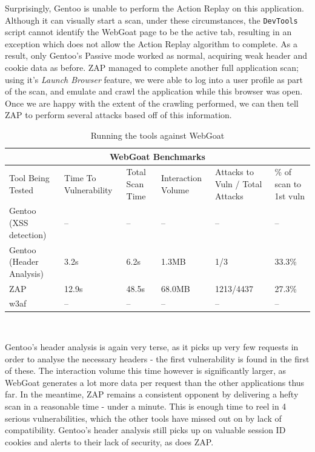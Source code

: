  Surprisingly, Gentoo is unable to perform the Action Replay on this application. Although it can visually start a scan, under these circumstances, the \texttt{DevTools} script cannot identify the WebGoat page to be the active tab, resulting in an exception which does not allow the Action Replay algorithm to complete. As a result, only Gentoo's Passive mode worked as normal, acquiring weak header and cookie data as before. ZAP managed to complete another full application scan; using it's \textit{Launch Browser} feature, we were able to log into a user profile as part of the scan, and emulate and crawl the application while this browser was open. Once we are happy with the extent of the crawling performed, we can then tell ZAP to perform several attacks based off of this information. \\

\begin{table}[h]
	
	{
		\captionsetup{justification=centering}		
		\caption{Running the tools against WebGoat}
		\label{table:webgoat_benchmarks}
		\begin{tabular}{ |p{4cm}||p{1.4cm}|p{1.4cm}|p{1.6cm}|p{2cm}|p{2cm}| }
			\hline
			\multicolumn{6}{|c|}{\textbf{WebGoat Benchmarks}} \\ [0.5ex]
			\hline \hline 
			Tool Being Tested& Time To Vulnerability & Total Scan Time & Interaction Volume & Attacks to Vuln / Total Attacks & \% of scan to 1st vuln \\
			\hline
			Gentoo (XSS detection)    & --     & --    &   --          & -- & -- \\
			Gentoo (Header Analysis) &  3.2s   & 6.2s   & 1.3MB   & 1/3 & 33.3\%\\
			ZAP                                   & 12.9s &  48.5s   & 68.0MB  & 1213/4437 & 27.3\%\\ 
			w3af                                 & -- & -- & -- & -- & -- \\
			\hline
		\end{tabular}
	} \\
\end{table}


Gentoo's header analysis is again very terse, as it picks up very few requests in order to analyse the necessary headers - the first vulnerability is found in the first of these. The interaction volume this time however is significantly larger, as WebGoat generates a lot more data per request than the other applications thus far. In the meantime, ZAP remains a consistent opponent by delivering a hefty scan in a reasonable time - under a minute. This is enough time to reel in 4 serious vulnerabilities, which the other tools have missed out on by lack of compatibility. Gentoo's header analysis still picks up on valuable session ID cookies and alerts to their lack of security, as does ZAP. 

